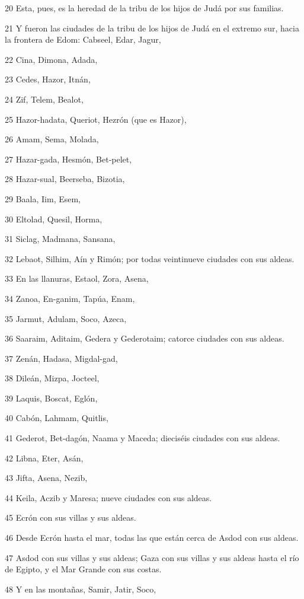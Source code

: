 \par 20 Esta, pues, es la heredad de la tribu de los hijos de Judá por sus familias.
\par 21 Y fueron las ciudades de la tribu de los hijos de Judá en el extremo sur, hacia la frontera de Edom: Cabseel, Edar, Jagur,
\par 22 Cina, Dimona, Adada,
\par 23 Cedes, Hazor, Itnán,
\par 24 Zif, Telem, Bealot,
\par 25 Hazor-hadata, Queriot, Hezrón (que es Hazor),
\par 26 Amam, Sema, Molada,
\par 27 Hazar-gada, Hesmón, Bet-pelet,
\par 28 Hazar-sual, Beerseba, Bizotia,
\par 29 Baala, Iim, Esem,
\par 30 Eltolad, Quesil, Horma,
\par 31 Siclag, Madmana, Sansana,
\par 32 Lebaot, Silhim, Aín y Rimón; por todas veintinueve ciudades con sus aldeas.
\par 33 En las llanuras, Estaol, Zora, Asena,
\par 34 Zanoa, En-ganim, Tapúa, Enam,
\par 35 Jarmut, Adulam, Soco, Azeca,
\par 36 Saaraim, Aditaim, Gedera y Gederotaim; catorce ciudades con sus aldeas.
\par 37 Zenán, Hadasa, Migdal-gad,
\par 38 Dileán, Mizpa, Jocteel,
\par 39 Laquis, Boscat, Eglón,
\par 40 Cabón, Lahmam, Quitlis,
\par 41 Gederot, Bet-dagón, Naama y Maceda; dieciséis ciudades con sus aldeas.
\par 42 Libna, Eter, Asán,
\par 43 Jifta, Asena, Nezib,
\par 44 Keila, Aczib y Maresa; nueve ciudades con sus aldeas. 
\par 45 Ecrón con sus villas y sus aldeas.
\par 46 Desde Ecrón hasta el mar, todas las que están cerca de Asdod con sus aldeas.
\par 47 Asdod con sus villas y sus aldeas; Gaza con sus villas y sus aldeas hasta el río de Egipto, y el Mar Grande con sus costas.
\par 48 Y en las montañas, Samir, Jatir, Soco,
